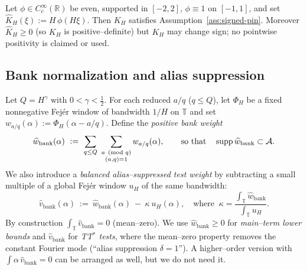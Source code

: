 \begin{lemma}\label{lem:model-K}
Let $\phi\in C_c^\infty(\mathbb R)$ be even, supported in $[-2,2]$, $\phi\equiv 1$ on $[-1,1]$, and set 
$\widehat K_H(\xi):= H\,\phi(H\xi)$. 
Then $K_H$ satisfies Assumption~\ref{ass:signed-pin}. 
Moreover $\widehat K_H\ge 0$ (so $K_H$ is positive--definite) but $K_H$ may change sign; no pointwise positivity is claimed or used.
\end{lemma}

\subsection{Bank normalization and alias suppression}\label{subsec:bank-alias}

Let $Q=H^\gamma$ with $0<\gamma<\frac12$. For each reduced $a/q$ ($q\le Q$), let
$\Phi_H$ be a fixed nonnegative Fejér window of bandwidth $1/H$ on $\mathbb T$
and set $w_{a/q}(\alpha):=\Phi_H(\alpha-a/q)$. Define the \emph{positive bank weight}
\begin{equation}\label{eq:wbank-def}
\widehat w_{\mathrm{bank}}(\alpha)\ :=\ \sum_{q\le Q}\ \sum_{\substack{a\pmod q\\(a,q)=1}} w_{a/q}(\alpha),
\qquad\text{so that}\quad \supp \widehat w_{\mathrm{bank}}\subset \cA.
\end{equation}
We also introduce a \emph{balanced alias–suppressed test weight} by subtracting a small multiple
of a global Fejér window $u_H$ of the same bandwidth:
\begin{equation}\label{eq:vbank-def}
\widehat v_{\mathrm{bank}}(\alpha)\ :=\ \widehat w_{\mathrm{bank}}(\alpha)\ -\ \kappa\ u_H(\alpha),
\quad\text{where }\ \kappa=\frac{\int_{\mathbb T}\widehat w_{\mathrm{bank}}}{\int_{\mathbb T} u_H}.
\end{equation}
By construction $\int_{\mathbb T}\widehat v_{\mathrm{bank}}=0$ (mean–zero). We use
$\widehat w_{\mathrm{bank}}\ge 0$ for \emph{main–term lower bounds} and $\widehat v_{\mathrm{bank}}$ for
\emph{TT$^\ast$ tests}, where the mean–zero property removes the constant Fourier mode (“alias suppression $\delta=1$”).
A higher–order version with $\int \alpha\,\widehat v_{\mathrm{bank}}=0$ can be arranged as well, but we do not need it.

